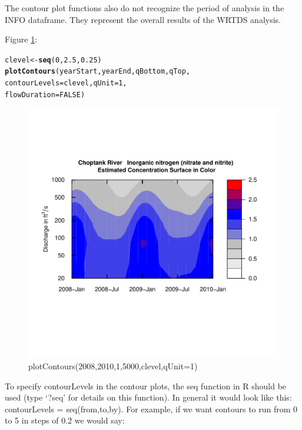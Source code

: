 \documentclass[a4paper,11pt]{article}\usepackage[]{graphicx}\usepackage[]{color}
\makeatletter
\newcommand{\hlnum}[1]{\textcolor[rgb]{0.686,0.059,0.569}{#1}}%
\newcommand{\hlstd}[1]{\textcolor[rgb]{0.345,0.345,0.345}{#1}}%
\newcommand{\hlkwb}[1]{\textcolor[rgb]{0.69,0.353,0.396}{#1}}%
\newcommand{\hlkwc}[1]{\textcolor[rgb]{0.333,0.667,0.333}{#1}}%
\newcommand{\hlkwd}[1]{\textcolor[rgb]{0.737,0.353,0.396}{\textbf{#1}}}%
\newenvironment{kframe}{%
 \def\at@end@of@kframe{}%
 \ifinner\ifhmode%
  \def\at@end@of@kframe{\end{minipage}}%
  \begin{minipage}{\columnwidth}%
 \fi\fi%
 \def\FrameCommand##1{\hskip\@totalleftmargin \hskip-\fboxsep
 \colorbox{shadecolor}{##1}\hskip-\fboxsep
     \hskip-\linewidth \hskip-\@totalleftmargin \hskip\columnwidth}%
 \MakeFramed {\advance\hsize-\width
   \@totalleftmargin\z@ \linewidth\hsize
   \@setminipage}}%
 {\par\unskip\endMakeFramed%
 \at@end@of@kframe}
\newenvironment{knitrout}{}{} %
\makeatother
\begin{document}
The contour plot functions also do not recognize the period of analysis in the INFO dataframe. They represent the overall results of the WRTDS analysis. 

Figure \ref{fig:plotContours}:
\begin{knitrout}
\color{fgcolor}\begin{kframe}
\begin{alltt}
\hlstd{clevel}\hlkwb{<-}\hlkwd{seq}\hlstd{(}\hlnum{0}\hlstd{,}\hlnum{2.5}\hlstd{,}\hlnum{0.25}\hlstd{)}
\hlkwd{plotContours}\hlstd{(yearStart,yearEnd,qBottom,qTop,}
             \hlkwc{contourLevels} \hlstd{= clevel,}\hlkwc{qUnit}\hlstd{=}\hlnum{1}\hlstd{,}
             \hlkwc{flowDuration}\hlstd{=}\hlnum{FALSE}\hlstd{)}
\end{alltt}
\end{kframe}\begin{figure}[]

\includegraphics[width=1\linewidth,height=1\linewidth]{figure/plotContours} \caption[plotContours(2008,2010,1,5000,clevel,qUnit=1)]{plotContours(2008,2010,1,5000,clevel,qUnit=1)\label{fig:plotContours}}
\end{figure}


\end{knitrout}


To specify contourLevels in the contour plots, the seq function in R should be used (type `?seq' for details on this function).  In general it would look like this: contourLevels = seq(from,to,by).  For example, if we want contours to run from 0 to 5 in steps of 0.2 we would say:  
\end{document}
